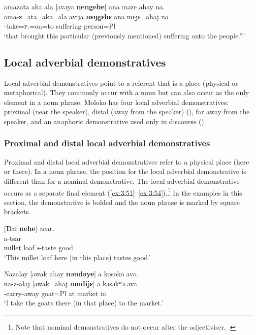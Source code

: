 \medskip
     amazata  aka  ala    [avəya \textbf{nengehe}] ana  məze  ahay  na.\\
\gll ama-z=ata=aka=ala      avija  \textbf{nɛŋgɛhɛ} ana    mɪʒɛ=ahaj   na\\
     {\DEP}-take=\textsc{p}.{\IO}=on=to  suffering  {\DEM}      {\DAT} person=Pl  {\PSP}\\
\glt ‘that brought this particular (previously mentioned)  suffering onto the people.”’  
\z

\subsection{Local adverbial demonstratives}\label{sec:3.2.2}
\hypertarget{RefHeading1210981525720847}{}
Local adverbial demonstratives point to a referent that is a place (physical or metaphorical). They commonly occur with a noun but can also occur as the only element in a noun phrase. Moloko has four local adverbial demonstratives: proximal (near the speaker), distal (away from the speaker) (), far away from the speaker, and an anaphoric demonstrative used only in discourse ().  

\subsubsection{Proximal and distal local adverbial demonstratives}\label{sec:3.2.2.1}

Proximal and distal local adverbial demonstratives refer to a physical place (here or there). In a noun phrase, the position for the local adverbial demonstrative is different than for a nominal demonstrative. The local adverbial demonstrative occurs as a separate final element (\ref{ex:3:51}--\ref{ex:3:54}).\footnote{Note that nominal demonstratives do not occur after the adjectiviser, .} In the examples in this section, the demonstrative is bolded and the noun phrase is marked by square brackets.

\ea \label{ex:3:51}
[Ɗaf  \textbf{nehe}]  acar.\\
  a-tsar\\
      {millet loaf}    {\DEM}  {\textsc{s}-taste good}\\
\glt  ‘This millet loaf here (in this place) tastes good.’
\z

\ea \label{ex:3:52}
      Nazalay      [awak  ahay  \textbf{nəndəye}]  a  kosoko  ava.\\
\gll  na-z-alaj    [awak=ahaj  \textbf{nɪndijɛ}]  a  kɔsɔkʷɔ  ava\\
      {\oneS}-carry-away  goat=Pl  {\DEM}    at  market  in\\
\glt  ‘I take the goats there (in that place) to the market.’
\z

